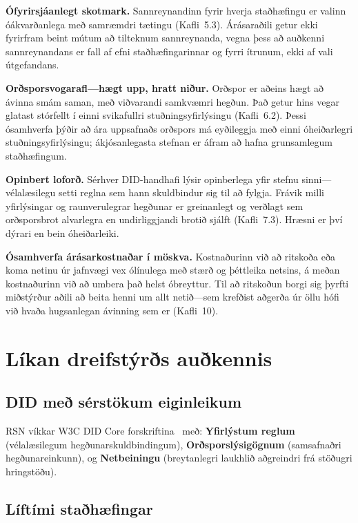 \documentclass[11pt,a4paper,twocolumn]{article}
\begin{document}
\textbf{Ófyrirsjáanlegt skotmark.} Sannreynandinn fyrir hverja staðhæfingu er valinn óákvarðanlega með samræmdri tætingu (Kafli~5.3). Árásaraðili getur ekki fyrirfram beint mútum að tilteknum sannreynanda, vegna þess að auðkenni sannreynandans er fall af efni staðhæfingarinnar og fyrri ítrunum, ekki af vali útgefandans.

\textbf{Orðsporsvogarafl---hægt upp, hratt niður.} Orðspor er aðeins hægt að ávinna smám saman, með viðvarandi samkvæmri hegðun. Það getur hins vegar glatast stórfellt í einni svikafullri stuðningsyfirlýsingu (Kafli~6.2). Þessi ósamhverfa þýðir að ára uppsafnaðs orðspors má eyðileggja með einni óheiðarlegri stuðningsyfirlýsingu; ákjósanlegasta stefnan er áfram að hafna grunsamlegum staðhæfingum.

\textbf{Opinbert loforð.} Sérhver DID-handhafi lýsir opinberlega yfir stefnu sinni---vélalæsilegu setti reglna sem hann skuldbindur sig til að fylgja. Frávik milli yfirlýsingar og raunverulegrar hegðunar er greinanlegt og verðlagt sem orðsporsbrot alvarlegra en undirliggjandi brotið sjálft (Kafli~7.3). Hræsni er því dýrari en bein óheiðarleiki.

\textbf{Ósamhverfa árásarkostnaðar í möskva.} Kostnaðurinn við að ritskoða eða koma netinu úr jafnvægi vex ólínulega með stærð og þéttleika netsins, á meðan kostnaðurinn við að umbera það helst óbreyttur. Til að ritskoðun borgi sig þyrfti miðstýrður aðili að beita henni um allt netið---sem krefðist aðgerða úr öllu hófi við hvaða hugsanlegan ávinning sem er (Kafli~10).

\section{Líkan dreifstýrðs auðkennis}

\subsection{DID með sérstökum eiginleikum}

RSN víkkar W3C DID Core forskriftina~\cite{did2022} með: \textbf{Yfirlýstum reglum} (vélalæsilegum hegðunarskuldbindingum), \textbf{Orðsporslýsigögnum} (samsafnaðri hegðunareinkunn), og \textbf{Netbeiningu} (breytanlegri laukhlið aðgreindri frá stöðugri hringstöðu).

\subsection{Líftími staðhæfingar}
\end{document}
